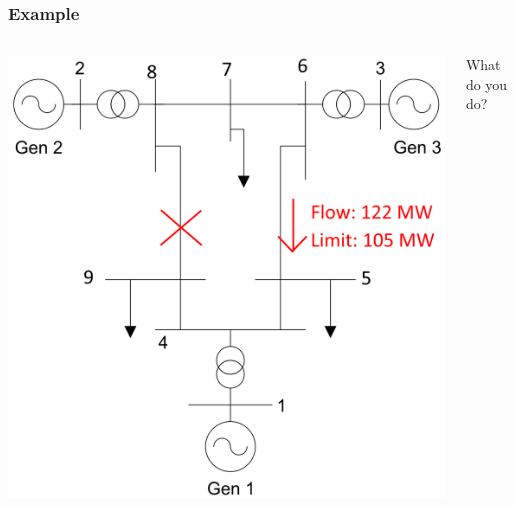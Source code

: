 \documentclass[compress]{beamer}
\begin{document}
\begin{frame}
  \frametitle{Example}
  \begin{columns}
    \begin{column}{0.7\textwidth}
\includegraphics[width=\textwidth]{Figs/ieee9_fault_line_8-9.png}
    \end{column}
    \begin{column}{0.3\textwidth}
      What do you do?
    \end{column}
  \end{columns}
\end{frame}
\end{document}
